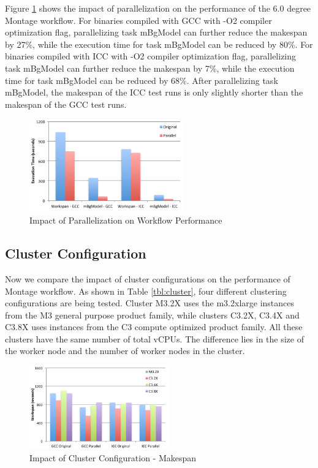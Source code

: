 Figure \ref{fig:parallel} shows the impact of parallelization on the performance of the 6.0 degree Montage workflow. For binaries compiled with GCC with -O2 compiler optimization flag, parallelizing task mBgModel can further reduce the makespan by 27\%, while the execution time for task mBgModel can be reduced by 80\%. For binaries compiled with ICC with -O2 compiler optimization flag, parallelizing task mBgModel can further reduce the makespan by 7\%, while the execution time for task mBgModel can be reduced by 68\%. After parallelizing task mBgModel, the makespan of the ICC test runs is only slightly shorter than the makespan of the GCC test runs.

\begin{figure}[t!]
\centering
\includegraphics[height=4cm]{fig02}
\vspace{-5pt}
\caption{Impact of Parallelization on Workflow Performance}
\vspace{-10pt}
\label{fig:parallel}
\end{figure}

\subsection{Cluster Configuration}
\label{v1_sec:cluster}


Now we compare the impact of cluster configurations on the performance of Montage workflow. As shown in Table \ref{tbl:cluster}, four different clustering configurations are being tested.  Cluster M3.2X uses the m3.2xlarge instances from the M3 general purpose product family, while clusters C3.2X, C3.4X and C3.8X uses instances from the C3 compute optimized product family. All these clusters have the same number of total vCPUs. The difference lies in the size of the worker node and the number of worker nodes in the cluster.


\begin{figure}[t!]
\centering
\includegraphics[width=6cm]{fig03}
\caption{Impact of Cluster Configuration - Makespan}
\label{fig:cluster}
\end{figure}

